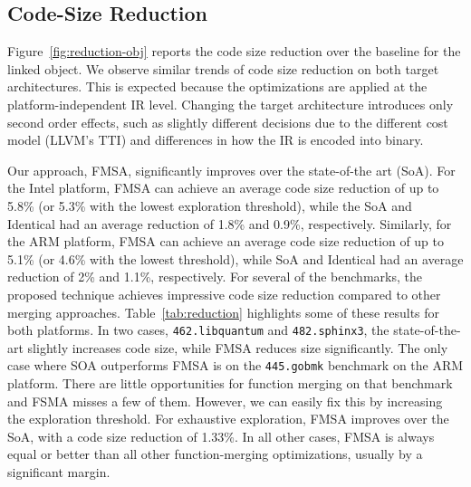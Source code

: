 \subsection{Code-Size Reduction}



Figure~\ref{fig:reduction-obj} reports the code size reduction over the baseline for the linked object. %
We observe similar trends of code size reduction on both target architectures. This is expected because the
optimizations are applied at the platform-independent IR level. Changing the target architecture introduces only second order effects,
such as slightly different decisions due to the different cost model (LLVM's TTI) and differences in how the IR is encoded into binary.

Our approach, FMSA, significantly improves over the state-of-the art (SoA). For the Intel platform, FMSA can achieve an average code size
reduction of up to 5.8\% (or 5.3\% with the lowest exploration threshold), while the SoA and Identical had an average reduction of 1.8\% and 0.9\%,
respectively. Similarly, for the ARM platform, FMSA can achieve an average code size reduction of up to 5.1\% (or 4.6\% with the lowest
threshold), while SoA and Identical had an average reduction of 2\% and 1.1\%, respectively. For several of the benchmarks, the
proposed technique achieves impressive code size reduction compared to other merging approaches. Table~\ref{tab:reduction} highlights
some of these results for both platforms. In two cases, \texttt{462.libquantum} and \texttt{482.sphinx3}, the state-of-the-art slightly
increases code size, while FMSA reduces size significantly.  The only case where SOA outperforms FMSA is on the \texttt{445.gobmk}
benchmark on the ARM platform. There are little opportunities for function merging on that benchmark and FSMA misses a few of them.
However, we can easily fix this by increasing the exploration threshold. For exhaustive exploration, FMSA improves over the SoA,
with a code size reduction of 1.33\%. In all other cases, FMSA is always equal or better than all other function-merging optimizations, usually by a significant margin.

